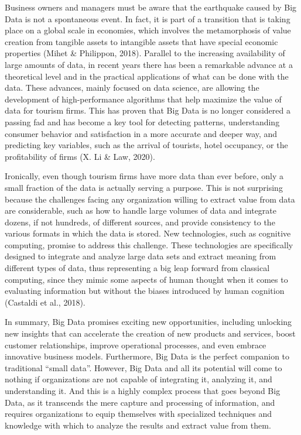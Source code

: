 \documentclass[
  letterpaper,
  DIV=11,
  numbers=noendperiod]{scrreprt}
\begin{document}
Business owners and managers must be aware that the earthquake caused by
Big Data is not a spontaneous event. In fact, it is part of a transition
that is taking place on a global scale in economies, which involves the
metamorphosis of value creation from tangible assets to intangible
assets that have special economic properties (Mihet \& Philippon, 2018).
Parallel to the increasing availability of large amounts of data, in
recent years there has been a remarkable advance at a theoretical level
and in the practical applications of what can be done with the data.
These advances, mainly focused on data science, are allowing the
development of high-performance algorithms that help maximize the value
of data for tourism firms. This has proven that Big Data is no longer
considered a passing fad and has become a key tool for detecting
patterns, understanding consumer behavior and satisfaction in a more
accurate and deeper way, and predicting key variables, such as the
arrival of tourists, hotel occupancy, or the profitability of firms (X.
Li \& Law, 2020).

Ironically, even though tourism firms have more data than ever before,
only a small fraction of the data is actually serving a purpose. This is
not surprising because the challenges facing any organization willing to
extract value from data are considerable, such as how to handle large
volumes of data and integrate dozens, if not hundreds, of different
sources, and provide consistency to the various formats in which the
data is stored. New technologies, such as cognitive computing, promise
to address this challenge. These technologies are specifically designed
to integrate and analyze large data sets and extract meaning from
different types of data, thus representing a big leap forward from
classical computing, since they mimic some aspects of human thought when
it comes to evaluating information but without the biases introduced by
human cognition (Castaldi et al., 2018).

In summary, Big Data promises exciting new opportunities, including
unlocking new insights that can accelerate the creation of new products
and services, boost customer relationships, improve operational
processes, and even embrace innovative business models. Furthermore, Big
Data is the perfect companion to traditional ``small data''. However,
Big Data and all its potential will come to nothing if organizations are
not capable of integrating it, analyzing it, and understanding it. And
this is a highly complex process that goes beyond Big Data, as it
transcends the mere capture and processing of information, and requires
organizations to equip themselves with specialized techniques and
knowledge with which to analyze the results and extract value from them.
\end{document}
